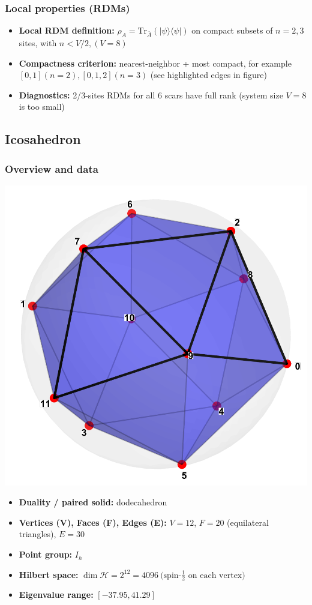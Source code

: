 \documentclass[11pt,a4paper]{article}
\begin{document}
\subsubsection*{Local properties (RDMs)}

\begin{itemize}[leftmargin=1.5em]
  \item \textbf{Local RDM definition:} $\rho_A=\mathrm{Tr}_{\bar A}(|\psi\rangle\langle\psi|)$ on compact subsets of $n=2,3$ sites, with $n < V/2, (V = 8)$
  \item \textbf{Compactness criterion:} nearest-neighbor + most compact, for example $[0,1] (n = 2), [0,1,2] (n = 3)$ (see highlighted edges in figure)
  \item \textbf{Diagnostics:} 2/3-sites RDMs for all 6 scars have full rank (system size $V=8$ is too small)
\end{itemize}


\subsection*{Icosahedron}

\subsubsection*{Overview and data}
\begin{center}
  \includegraphics[width=.6\linewidth]{icosahedron}
\end{center}

\begin{itemize}[leftmargin=1.5em]
  \item \textbf{Duality / paired solid:} dodecahedron
  \item \textbf{Vertices (V), Faces (F), Edges (E):} $V = 12$,\; $F = 20$ (equilateral triangles),\; $E = 30$
  \item \textbf{Point group:} $I_h$
  \item \textbf{Hilbert space:} \(
        \dim\mathcal{H} = 2^{12} = 4096\ \text{(spin-$\tfrac12$ on each vertex)}
        \)
  \item \textbf{Eigenvalue range:} $[-37.95, 41.29]$
\end{itemize}
\end{document}
